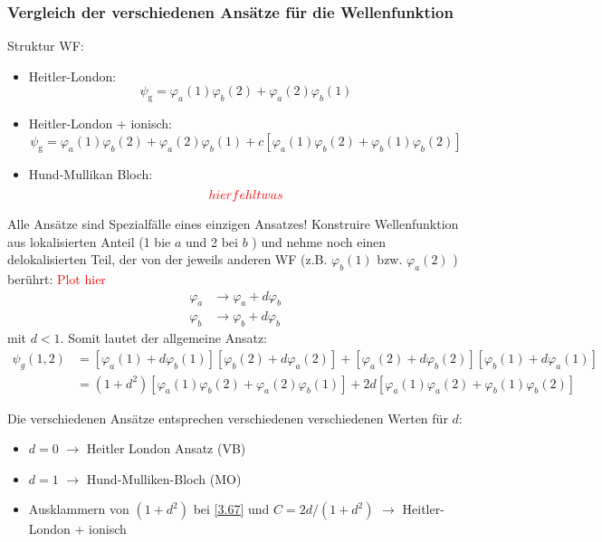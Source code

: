 \subsubsection{Vergleich der verschiedenen Ansätze für die Wellenfunktion}
Struktur WF:
\begin{itemize}
	\item Heitler-London:
		\begin{equation}
			\label{3.61}
			\psi_{\mathrm{g}} = \varphi_{a}(1) \varphi_{b}(2) + \varphi_{a}(2) \varphi_{b}(1)
		\end{equation}
	\item Heitler-London + ionisch:
		\begin{equation}
			\label{3.62}
			\psi_{\mathrm{g}} = \varphi_{a} (1) \varphi_{b}(2) + \varphi_{a}(2) \varphi_{b}(1) + c\left[ \varphi_{a}(1) \varphi_{b}(2) + \varphi_{b}(1) \varphi_{b}(2) \right] 
		\end{equation}
	\item Hund-Mullikan Bloch:
		\begin{equation}
			\label{3.63}	
			\textcolor{red}{hier fehlt was}
		\end{equation}
\end{itemize}

Alle Ansätze sind Spezialfälle eines einzigen Ansatzes! Konstruire Wellenfunktion aus lokalisierten Anteil (1 bie $a$ und 2 bei $b$ ) und nehme noch einen delokalisierten Teil, der von der jeweils anderen WF (z.B. $ \varphi_{b}(1)$ bzw. $ \varphi_{a}(2)$ ) berührt:
\textcolor{red}{Plot hier}
\begin{align}
	\label{3.64}
	\varphi_{a} &\to \varphi_{a} + d \varphi_{b} \\
	\label{3.65}
	\varphi_{b} &\to \varphi_{b} + d \varphi_{b}
\end{align}
mit $d < 1$. Somit lautet der allgemeine Ansatz:
\begin{align}
	\label{3.66}
	\psi_{g}(1,2) &= \left[ \varphi_{a} (1) + d \varphi_{b}(1) \right] \left[ \varphi_{b} (2) + d \varphi_{a}(2) \right] + \left[ \varphi_{a}(2) + d \varphi_{b}(2) \right] \left[ \varphi_{b}(1) + d\varphi_{a}(1) \right]  \\
	\label{3.67}
	&= \left( 1 + d^2 \right) \left[ \varphi_{a}(1) \varphi_{b}(2) + \varphi_{a}(2) \varphi_{b}(1) \right] + 2d \left[ \varphi_{a}(1) \varphi_{a}(2) + \varphi_{b}(1) \varphi_{b}(2) \right] 
\end{align}

Die verschiedenen Ansätze entsprechen verschiedenen verschiedenen Werten für $d $:
\begin{itemize}
	\item $d = 0$ $\to $ Heitler London Ansatz (VB)
	\item $d=1$ $\to $ Hund-Mulliken-Bloch (MO)
	\item Ausklammern von $\left( 1+d^2 \right) $ bei \ref{3.67} und $ C = 2d / \left( 1+d^2 \right) $ $\to $ Heitler-London + ionisch
\end{itemize}

